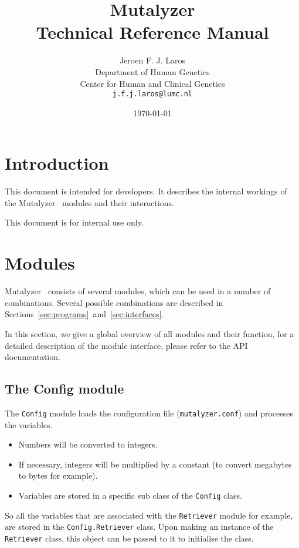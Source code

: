 \documentclass{article}
\title{\Huge Mutalyzer \thisversion\\
       Technical Reference Manual}
\author{Jeroen F. J. Laros
        \vspace{10pt}\\
        Department of Human Genetics\\
        Center for Human and Clinical Genetics\\
        \texttt{j.f.j.laros@lumc.nl}}
\date{\today}
\begin{document}
\maketitle
\thispagestyle{empty}
\newpage

\tableofcontents
\newpage


\section{Introduction} \label{sec:introduction}
This document is intended for developers. It describes the internal workings
of the Mutalyzer \thisversion\ modules and their interactions.

This document is for internal use only.

\newpage

\section{Modules} \label{sec:modules}
Mutalyzer \thisversion\ consists of several modules, which can be used in a
number of combinations. Several possible combinations are described in 
Sections~\ref{sec:programs}~and~\ref{sec:interfaces}.

In this section, we give a global overview of all modules and their function,
for a detailed description of the module interface, please refer to the 
API~\cite{API} documentation.

\subsection{The Config module} \label{subsec:config}
The \texttt{Config} module loads the configuration file
(\texttt{mutalyzer.conf}) and processes the variables. 

\begin{itemize}
\item Numbers will be converted to integers.
\item If necessary, integers will be multiplied by a constant (to convert 
      megabytes to bytes for example).
\item Variables are stored in a specific sub class of the \texttt{Config}
      class. 
\end{itemize}

So all the variables that are associated with the \texttt{Retriever} module for
example, are stored in the \texttt{Config.Retriever} class. Upon making an 
instance of the \texttt{Retriever} class, this object can be passed to it to
initialise the class.
\end{document}
